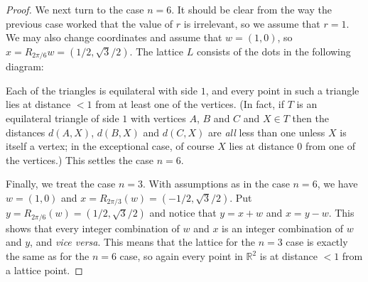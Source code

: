 \documentclass{amsart}
\newcommand{\R}         {{\mathbb{R}}}
\newcommand{\blob}      {circle(0.03cm)}
\renewcommand{\:}{\colon}
\theoremstyle{definition}
\begin{document}
\begin{proof}
 We next turn to the case $n=6$.  It should be clear from the way the
 previous case worked that the value of $r$ is irrelevant, so we
 assume that $r=1$.  We may also change coordinates and assume that
 $w=(1,0)$, so $x=R_{2\pi/6}w=(1/2,\sqrt{3}/2)$.  The lattice $L$
 consists of the dots in the following diagram:
 \begin{center}
 \end{center}
 Each of the triangles is equilateral with side $1$, and every point
 in such a triangle lies at distance $<1$ from at least one of the
 vertices.  (In fact, if $T$ is an equilateral triangle of side $1$
 with vertices $A$, $B$ and $C$ and $X\in T$ then the distances
 $d(A,X)$, $d(B,X)$ and $d(C,X)$ are \emph{all} less than one unless
 $X$ is itself a vertex; in the exceptional case, of course $X$ lies
 at distance $0$ from one of the vertices.)  This settles the case
 $n=6$.

 Finally, we treat the case $n=3$.  With assumptions as in the case
 $n=6$, we have $w=(1,0)$ and $x=R_{2\pi/3}(w)=(-1/2,\sqrt{3}/2)$.  Put
 $y=R_{2\pi/6}(w)=(1/2,\sqrt{3}/2)$ and notice that $y=x+w$ and
 $x=y-w$.  This shows that every integer combination of $w$ and $x$ is
 an integer combination of $w$ and $y$, and \emph{vice versa}.  This
 means that the lattice for the $n=3$ case is exactly the same as for
 the $n=6$ case, so again every point in $\R^2$ is at distance $<1$
 from a lattice point.
\end{proof}
\end{document}
